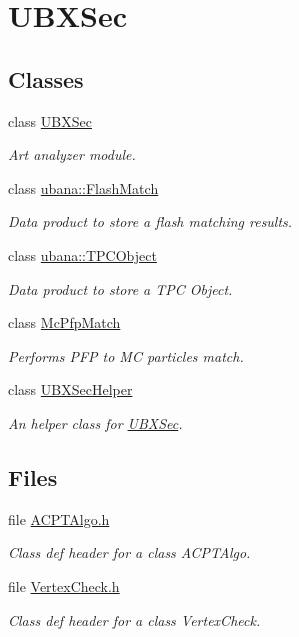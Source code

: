 \hypertarget{group__UBXSec}{\section{\-U\-B\-X\-Sec}
\label{group__UBXSec}
}
\subsection*{\-Classes}
\begin{DoxyCompactItemize}
\item 
class \hyperlink{classUBXSec}{\-U\-B\-X\-Sec}
\begin{DoxyCompactList}\small\item\em \-Art analyzer module. \end{DoxyCompactList}\item 
class \hyperlink{classubana_1_1FlashMatch}{ubana\-::\-Flash\-Match}
\begin{DoxyCompactList}\small\item\em \-Data product to store a flash matching results. \end{DoxyCompactList}\item 
class \hyperlink{classubana_1_1TPCObject}{ubana\-::\-T\-P\-C\-Object}
\begin{DoxyCompactList}\small\item\em \-Data product to store a \-T\-P\-C \-Object. \end{DoxyCompactList}\item 
class \hyperlink{classMcPfpMatch}{\-Mc\-Pfp\-Match}
\begin{DoxyCompactList}\small\item\em \-Performs \-P\-F\-P to \-M\-C particles match. \end{DoxyCompactList}\item 
class \hyperlink{classUBXSecHelper}{\-U\-B\-X\-Sec\-Helper}
\begin{DoxyCompactList}\small\item\em \-An helper class for \hyperlink{classUBXSec}{\-U\-B\-X\-Sec}. \end{DoxyCompactList}\end{DoxyCompactItemize}
\subsection*{\-Files}
\begin{DoxyCompactItemize}
\item 
file \hyperlink{ACPTAlgo_8h}{\-A\-C\-P\-T\-Algo.\-h}
\begin{DoxyCompactList}\small\item\em \-Class def header for a class \-A\-C\-P\-T\-Algo. \end{DoxyCompactList}\item 
file \hyperlink{VertexCheck_8h}{\-Vertex\-Check.\-h}
\begin{DoxyCompactList}\small\item\em \-Class def header for a class \-Vertex\-Check. \end{DoxyCompactList}\end{DoxyCompactItemize}

